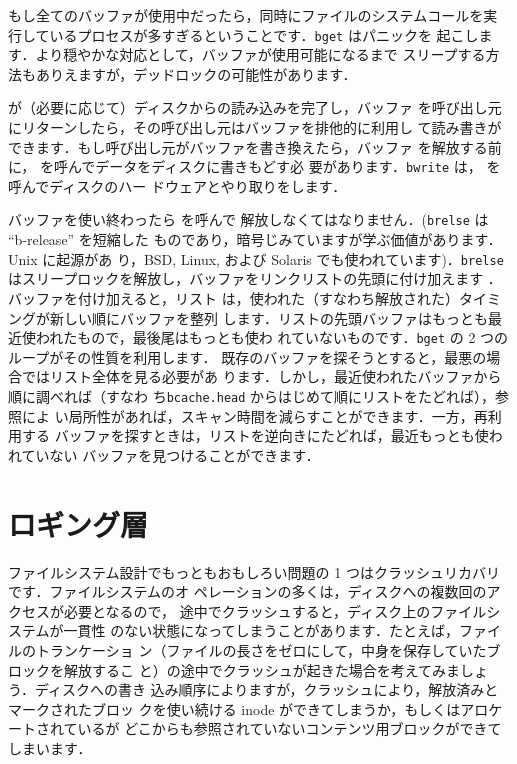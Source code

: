 もし全てのバッファが使用中だったら，同時にファイルのシステムコールを実
行しているプロセスが多すぎるということです．\texttt{bget} はパニックを
起こします．より穏やかな対応として，バッファが使用可能になるまで
スリープする方法もありえますが，デッドロックの可能性があります．

 が（必要に応じて）ディスクからの読み込みを完了し，バッファ
を呼び出し元にリターンしたら，その呼び出し元はバッファを排他的に利用し
て読み書きができます．もし呼び出し元がバッファを書き換えたら，バッファ
を解放する前に， を呼んでデータをディスクに書きもどす必
要があります．\texttt{bwrite}
 は，
 を呼んでディスクのハー
ドウェアとやり取りをします．

バッファを使い終わったら  を呼んで
解放しなくてはなりません．(\texttt{brelse} は ``b-release'' を短縮した
ものであり，暗号じみていますが学ぶ価値があります．Unix に起源があ
り，BSD, Linux, および Solaris でも使われています)．\texttt{brelse}
はスリープロックを解放し，バッファをリンクリストの先頭に付け加えます
．
バッファを付け加えると，リスト
は，使われた（すなわち解放された）タイミングが新しい順にバッファを整列
します．リストの先頭バッファはもっとも最近使われたもので，最後尾はもっとも使わ
れていないものです．\texttt{bget} の 2 つのループがその性質を利用します．
既存のバッファを探そうとすると，最悪の場合ではリスト全体を見る必要があ
ります．しかし，最近使われたバッファから順に調べれば（すなわ
ち\texttt{bcache.head} からはじめて順にリストをたどれば），参照によ
い局所性があれば，スキャン時間を減らすことができます．一方，再利用する
バッファを探すときは，リストを逆向きにたどれば，最近もっとも使われていない
バッファを見つけることができます．

\section{ロギング層}

ファイルシステム設計でもっともおもしろい問題の 1 つはクラッシュリカバリ
です．ファイルシステムのオ
ペレーションの多くは，ディスクへの複数回のアクセスが必要となるので，
途中でクラッシュすると，ディスク上のファイルシステムが一貫性
のない状態になってしまうことがあります．たとえば，ファイルのトランケーショ
ン（ファイルの長さをゼロにして，中身を保存していたブロックを解放するこ
と）の途中でクラッシュが起きた場合を考えてみましょう．ディスクへの書き
込み順序によりますが，クラッシュにより，解放済みとマークされたブロッ
クを使い続ける inode ができてしまうか，もしくはアロケートされているが
どこからも参照されていないコンテンツ用ブロックができてしまいます．

